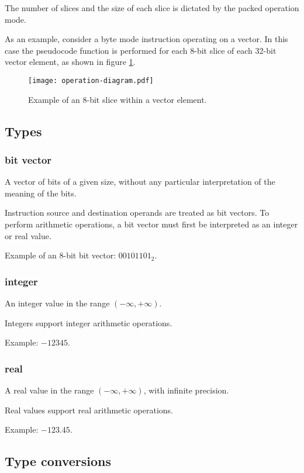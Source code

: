 The number of slices and the size of each slice is dictated by the packed
operation mode.

As an example, consider a byte mode instruction operating on a vector. In this
case the pseudocode function is performed for each 8-bit slice of each 32-bit
vector element, as shown in figure \ref{fig:operation-diagram}.

\begin{figure}[h]
  \texttt{[image: operation-diagram.pdf]}
  \caption{Example of an 8-bit slice within a vector element.}
  \label{fig:operation-diagram}
\end{figure}

\subsection{Types}

\subsubsection{bit vector}

A vector of bits of a given size, without any particular interpretation of the
meaning of the bits.

Instruction source and destination operands are treated as bit vectors. To
perform arithmetic operations, a bit vector must first be interpreted as an
integer or real value.

Example of an 8-bit bit vector: $00101101_2$.

\subsubsection{integer}

An integer value in the range $(-\infty, +\infty)$.

Integers support integer arithmetic operations.

Example: $-12345$.

\subsubsection{real}

A real value in the range $(-\infty, +\infty)$, with infinite precision.

Real values support real arithmetic operations.

Example: $-123.45$.

\subsection{Type conversions}

